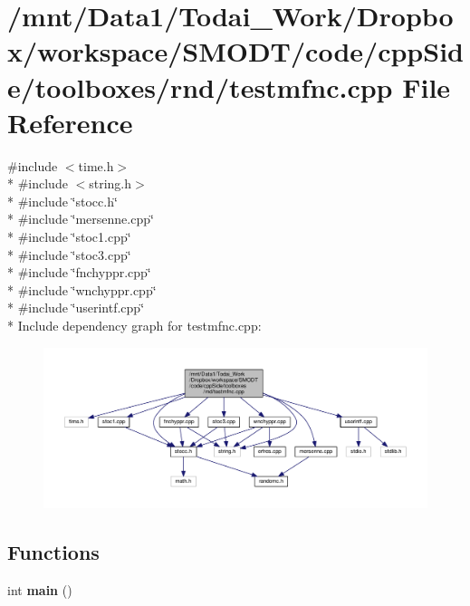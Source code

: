 \section{/mnt/\-Data1/\-Todai\-\_\-\-Work/\-Dropbox/workspace/\-S\-M\-O\-D\-T/code/cpp\-Side/toolboxes/rnd/testmfnc.cpp File Reference}
\label{toolboxes_2rnd_2testmfnc_8cpp}
{\ttfamily \#include $<$time.\-h$>$}\\*
{\ttfamily \#include $<$string.\-h$>$}\\*
{\ttfamily \#include \char`\"{}stocc.\-h\char`\"{}}\\*
{\ttfamily \#include \char`\"{}mersenne.\-cpp\char`\"{}}\\*
{\ttfamily \#include \char`\"{}stoc1.\-cpp\char`\"{}}\\*
{\ttfamily \#include \char`\"{}stoc3.\-cpp\char`\"{}}\\*
{\ttfamily \#include \char`\"{}fnchyppr.\-cpp\char`\"{}}\\*
{\ttfamily \#include \char`\"{}wnchyppr.\-cpp\char`\"{}}\\*
{\ttfamily \#include \char`\"{}userintf.\-cpp\char`\"{}}\\*
Include dependency graph for testmfnc.\-cpp\-:\nopagebreak
\begin{figure}[H]
\begin{center}
\leavevmode
\includegraphics[width=350pt]{toolboxes_2rnd_2testmfnc_8cpp__incl}
\end{center}
\end{figure}
\subsection*{Functions}
\begin{DoxyCompactItemize}
\item 
int {\bf main} ()
\end{DoxyCompactItemize}
